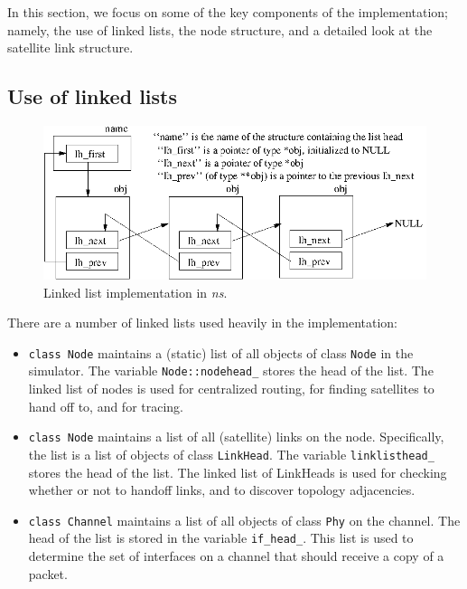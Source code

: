 In this section, we focus on some of the key components of the implementation;
namely, the use of linked lists, the node structure, and a detailed look
at the satellite link structure.

\subsection{Use of linked lists}
\label{sec:satellite/implementation/list}

\begin{figure}
    \centerline{\includegraphics{linked-list}}
    \caption{Linked list implementation in \emph{ns}.}
    \label{fig:linked-list}
\end{figure}

There are a number of linked lists used heavily in the implementation:
\begin{itemize}

\item {\tt class Node} maintains a (static) list of all objects of class
{\tt Node} in the simulator.  The variable {\tt Node::nodehead\_} stores
the head of the list.  The linked list of nodes is used for centralized
routing, for finding satellites to hand off to, and for tracing.

\item {\tt class Node} maintains a list of all (satellite) links on the
node.  Specifically, the list is a list of objects of class {\tt LinkHead}. 
The variable {\tt linklisthead\_} stores the head of the list.  The
linked list of LinkHeads is used for checking whether or not to handoff
links, and to discover topology adjacencies.

\item {\tt class Channel} maintains a list of all objects of class
{\tt Phy} on the channel.  The head of the list is stored in the variable
{\tt if\_head\_}.  This list is used to determine the set of interfaces on a
channel that should receive a copy of a packet.
\end{itemize}

